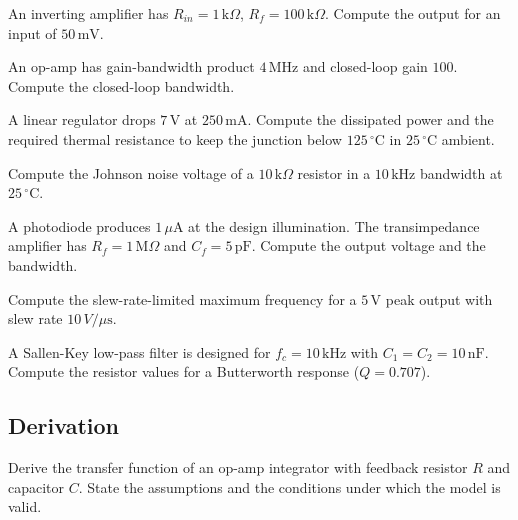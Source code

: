 \begin{exercise}
An inverting amplifier has $R_{in} = 1\,\text{k}\Omega$, $R_f = 100\,\text{k}\Omega$. Compute the output for an input of $50\,\text{mV}$.
\end{exercise}

\begin{exercise}
An op-amp has gain-bandwidth product $4\,\text{MHz}$ and closed-loop gain $100$. Compute the closed-loop bandwidth.
\end{exercise}

\begin{exercise}
A linear regulator drops $7\,\text{V}$ at $250\,\text{mA}$. Compute the dissipated power and the required thermal resistance to keep the junction below $125\,^\circ\text{C}$ in $25\,^\circ\text{C}$ ambient.
\end{exercise}

\begin{exercise}
Compute the Johnson noise voltage of a $10\,\text{k}\Omega$ resistor in a $10\,\text{kHz}$ bandwidth at $25\,^\circ\text{C}$.
\end{exercise}

\begin{exercise}
A photodiode produces $1\,\mu\text{A}$ at the design illumination. The transimpedance amplifier has $R_f = 1\,\text{M}\Omega$ and $C_f = 5\,\text{pF}$. Compute the output voltage and the bandwidth.
\end{exercise}

\begin{exercise}
Compute the slew-rate-limited maximum frequency for a $5\,\text{V}$ peak output with slew rate $10\,V/\mu\text{s}$.
\end{exercise}

\begin{exercise}
A Sallen-Key low-pass filter is designed for $f_c = 10\,\text{kHz}$ with $C_1 = C_2 = 10\,\text{nF}$. Compute the resistor values for a Butterworth response ($Q = 0.707$).
\end{exercise}

\subsection*{Derivation}

\begin{exercise}
Derive the transfer function of an op-amp integrator with feedback resistor $R$ and capacitor $C$. State the assumptions and the conditions under which the model is valid.
\end{exercise}


